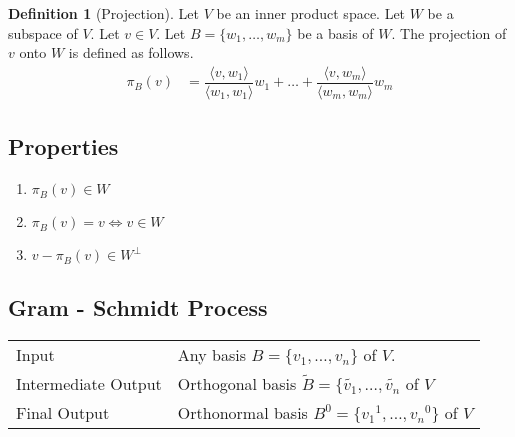 \documentclass[fleqn, a4paper, 12pt]{article}
\theoremstyle{definition}
\newtheorem{definition}{Definition} %
\theoremstyle{theorem}
\theoremstyle{remark}
\numberwithin{corollary}{theorem}
\numberwithin{equation}{theorem}
\begin{document}
\begin{definition}[Projection]
	Let $V$ be an inner product space. Let $W$ be a subspace of $V$. Let $v \in V$.	Let $B = \{w_1, \dots, w_m\}$ be a basis of $W$. The projection of $v$ onto $W$ is defined as follows.\\
	\begin{align*}
		\pi_B (v) &= \dfrac{\langle v, w_1 \rangle}{\langle w_1, w_1 \rangle} w_1 + \dots + \dfrac{\langle v, w_m \rangle}{\langle w_m, w_m \rangle} w_m
	\end{align*}
\end{definition}

\subsection{Properties}

\begin{enumerate}
	\item $\pi_B (v) \in W$
	\item $\pi_B (v) = v \iff v \in W$
	\item $v - \pi_B (v) \in W^{\perp}$
\end{enumerate}

\subsection{Gram - Schmidt Process}

\begin{tabular}{l l}
	Input & Any basis $B = \{v_1, \dots, v_n\}$ of $V$.\\
	Intermediate Output & Orthogonal basis $\widetilde{B} = \{\widetilde{v_1}, \dots, \widetilde{v_n}$ of $V$\\
	Final Output & Orthonormal basis $B^0 = \{{v_1}^1, \dots, {v_n}^0\}$ of $V$\\
\end{tabular}
\end{document}
